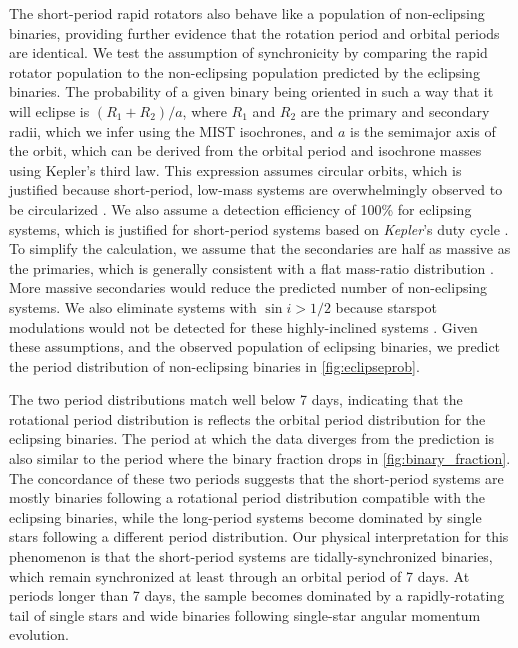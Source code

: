 \documentclass[manuscript]{aastex6}
\newcommand{\Kepler}{\mbox{\textit{Kepler}}}
\begin{document}
The short-period rapid rotators also behave like a population of non-eclipsing
binaries, providing further evidence that the rotation period and orbital
periods are identical. We test the assumption of synchronicity by comparing the
rapid rotator population to the non-eclipsing population predicted by the
eclipsing binaries. The probability of a given binary being oriented in such a
way that it will eclipse is \((R_1 + R_2)/a\), where \(R_1\) and \(R_2\) are
the primary and secondary radii, which we infer using the MIST isochrones, 
and \(a\) is the semimajor axis of the orbit, which can be derived from the
orbital period and isochrone masses using Kepler's third law.
This expression assumes circular orbits, which is justified because
short-period, low-mass systems are overwhelmingly observed to be circularized
\citep{Raghavan10,VanEylen16}. We also assume a detection efficiency of 100\%
for eclipsing systems, which is justified for short-period systems based on 
\Kepler{}'s duty cycle \citep{Kirk16}. To simplify the calculation, we
assume that the secondaries are half as massive as the primaries, which is
generally consistent with a flat mass-ratio distribution \citep{Raghavan10}. 
More massive secondaries would reduce the predicted number of non-eclipsing 
systems. We also eliminate systems with \(\sin i > 1/2\) because starspot
modulations would not be detected for these highly-inclined systems 
\citep{Jackson10,Rebull17}. Given these assumptions, and the observed 
population of eclipsing binaries, we predict the period distribution of 
non-eclipsing binaries in \cref{fig:eclipseprob}. 

The two period distributions match well below 7 days, indicating
that the rotational period distribution is reflects the orbital period
distribution for the eclipsing binaries. The period at which the data diverges
from the prediction is also similar to the period where the binary fraction 
drops in \cref{fig:binary_fraction}. The concordance of these two periods 
suggests that the short-period systems are mostly binaries following a 
rotational period distribution compatible with the eclipsing binaries, while 
the long-period systems become dominated by single stars following a different 
period distribution. Our physical interpretation for this phenomenon is that the
short-period systems are tidally-synchronized binaries, which remain 
synchronized at least through an orbital period of 7 days. At periods longer
than 7 days, the sample becomes dominated by a rapidly-rotating tail of single
stars and wide binaries following single-star angular momentum evolution.
\end{document}
